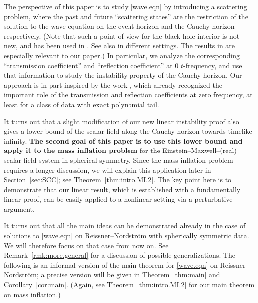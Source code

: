 \documentclass[10pt, reqno]{amsart}
\theoremstyle{definition}
\theoremstyle{remark}
\numberwithin{equation}{section}
\newcommand{\0}{\emptyset}
\begin{document}
The perspective of this paper is to study \eqref{wave.eqn} by introducing a scattering problem, where the past and future ``scattering states'' are the restriction of the solution to the wave equation on the event horizon and the Cauchy horizon respectively. (Note that such a point of view for the black hole interior is not new, and has been used in \cite{DafShl,McN,KSR}. See also \cite{KehleAdS,KehleVdM} in different settings. The results in \cite{KSR} are especially relevant to our paper.) In particular, we analyze the corresponding ``transmission coefficient'' and ``reflection coefficient'' at $0$ $t$-frequency, and use that information to study the instability property of the Cauchy horizon. Our approach is in part inspired by the work \cite{GSNS}, which already recognized the important role of the transmission and reflection coefficients at zero frequency, at least for a class of data with exact polynomial tail.


It turns out that a slight modification of our new linear instability proof also gives a lower bound of the scalar field along the Cauchy horizon towards timelike infinity. \textbf{The second goal of this paper is to use this lower bound and apply it to the mass inflation problem} for the Einstein--Maxwell--(real) scalar field system in spherical symmetry. Since the mass inflation problem requires a longer discussion, we will explain this application later in Section~\ref{sec:SCC}; see Theorem~\ref{thm:intro.MI.2}. The key point here is to demonstrate that our linear result, which is established with a fundamentally linear proof, can be easily applied to a nonlinear setting via a perturbative argument.

It turns out that all the main ideas can be demonstrated already in the case of solutions to \eqref{wave.eqn} on Reissner--Nordstr\"om with spherically symmetric data. We will therefore focus on that case from now on. See Remark~\ref{rmk:more.general} for a discussion of possible generalizations. The following is an informal version of the main theorem for \eqref{wave.eqn} on Reissner--Nordstr\"om; a precise version will be given in Theorem~\ref{thm:main} and Corollary~\ref{cor:main}. (Again, see Theorem~\ref{thm:intro.MI.2} for our main theorem on mass inflation.)
\end{document}
